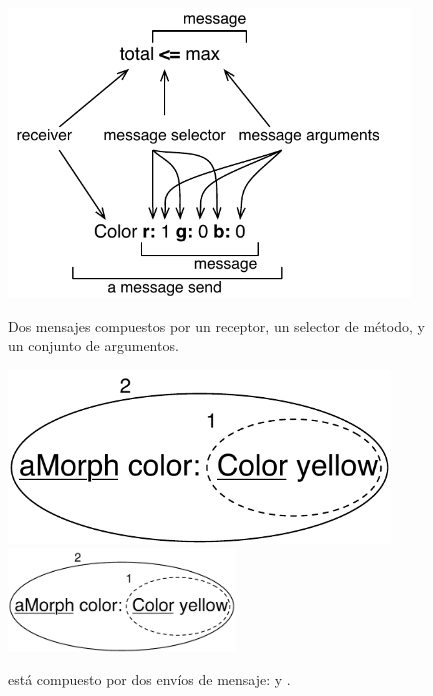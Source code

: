 \documentclass[a4paper,10pt,twoside]{book}
\begin{document}
\begin{figure}[htb]
\begin{minipage}{0.53\textwidth}
	\begin{center}
	\includegraphics[width=0.95\textwidth]{message}
	\caption{Dos mensajes compuestos por un receptor, un selector de m\'etodo, y un conjunto de argumentos.}\end{center}
\end{minipage}
\hfill
\begin{minipage}{0.43\textwidth}
	\begin{center}
	\ifluluelse
		{\includegraphics[width=0.9\textwidth]{uKeyUnOne}}
		{\includegraphics[width=6cm]{uKeyUnOne}}
    \caption{ est\'a compuesto por dos env\'ios de mensaje:  y .}
	\end{center}
\end{minipage}
\end{figure}
\end{document}
